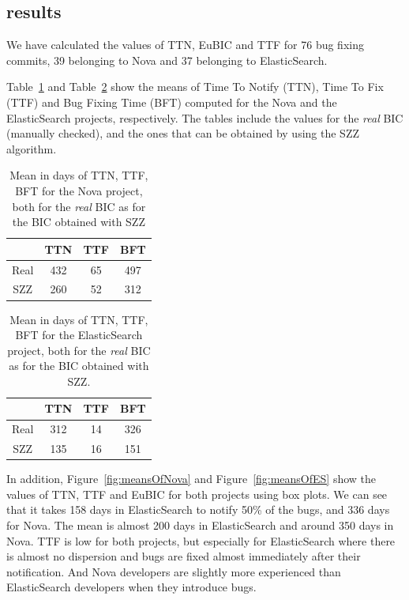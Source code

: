 \documentclass[10pt, conference]{IEEEtran}
\begin{document}
\subsection{results}

We have calculated the values of TTN, EuBIC and TTF for 76 bug fixing commits, 39 belonging to Nova and 37 belonging to ElasticSearch. 

Table~\ref{tableNova} and Table~\ref{tableES} show the means of Time To Notify (TTN), Time To Fix (TTF) and Bug Fixing Time (BFT) computed for the Nova and the ElasticSearch projects, respectively. The tables include the values for the \emph{real} BIC (manually checked), and the ones that can be obtained by using the SZZ algorithm.

\begin{table}[!t]
\renewcommand{\arraystretch}{1.3}
\centering
\caption{Mean in days of TTN, TTF, BFT for the Nova project, both for the \emph{real} BIC as for the BIC obtained with SZZ}
\label{tableNova}
\begin{tabular}{|c||c||c||c| }
\hline
  & TTN & TTF & BFT \\
\hline
Real & 432 & 65 & 497 \\
\hline
SZZ & 260 & 52 & 312\\
\hline
\end{tabular}
\end{table}

\begin{table}[!t]
\renewcommand{\arraystretch}{1.3}
\centering
\caption{Mean in days of TTN, TTF, BFT for the ElasticSearch project, both for the \emph{real} BIC as for the BIC obtained with SZZ.}
\label{tableES}
\begin{tabular}{|c||c||c||c| }
\hline
  & TTN & TTF & BFT \\
\hline
Real & 312 & 14 & 326 \\
\hline
SZZ & 135 & 16 & 151\\
\hline
\end{tabular}
\end{table}

In addition, Figure~\ref{fig:meansOfNova} and Figure~\ref{fig:meansOfES} show the values of TTN, TTF and EuBIC for both projects using box plots. We can see that it takes 158 days in ElasticSearch to notify 50\% of the bugs, and 336 days for Nova. The mean is almost 200 days in ElasticSearch and around 350 days in Nova. TTF is low for both projects, but especially for ElasticSearch where there is almost no dispersion and bugs are fixed almost immediately after their notification. And Nova developers are slightly more experienced than ElasticSearch developers when they introduce bugs.
\end{document}
